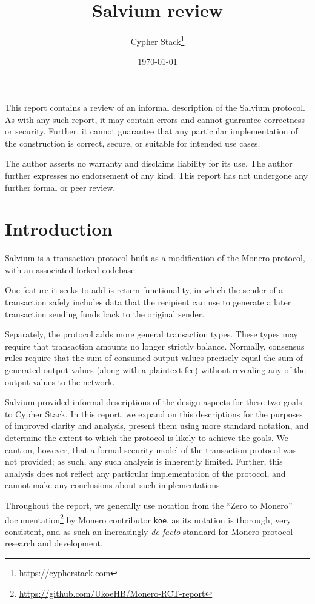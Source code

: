 \documentclass{article}
\title{Salvium review}
\author{Cypher Stack\thanks{\url{https://cypherstack.com}}}
\date{\today}
\begin{document}
\maketitle

This report contains a review of an informal description of the Salvium protocol.
As with any such report, it may contain errors and cannot guarantee correctness or security.
Further, it cannot guarantee that any particular implementation of the construction is correct, secure, or suitable for intended use cases.

The author asserts no warranty and disclaims liability for its use.
The author further expresses no endorsement of any kind.
This report has not undergone any further formal or peer review.

\tableofcontents


\section{Introduction}

Salvium is a transaction protocol built as a modification of the Monero protocol, with an associated forked codebase.

One feature it seeks to add is return functionality, in which the sender of a transaction safely includes data that the recipient can use to generate a later transaction sending funds back to the original sender.

Separately, the protocol adds more general transaction types.
These types may require that transaction amounts no longer strictly balance.
Normally, consensus rules require that the sum of consumed output values precisely equal the sum of generated output values (along with a plaintext fee) without revealing any of the output values to the network.

Salvium provided informal descriptions of the design aspects for these two goals to Cypher Stack.
In this report, we expand on this descriptions for the purposes of improved clarity and analysis, present them using more standard notation, and determine the extent to which the protocol is likely to achieve the goals.
We caution, however, that a formal security model of the transaction protocol was not provided; as such, any such analysis is inherently limited.
Further, this analysis does not reflect any particular implementation of the protocol, and cannot make any conclusions about such implementations.

Throughout the report, we generally use notation from the ``Zero to Monero'' documentation\footnote{\url{https://github.com/UkoeHB/Monero-RCT-report}} by Monero contributor \texttt{koe}, as its notation is thorough, very consistent, and as such an increasingly \textit{de facto} standard for Monero protocol research and development.
\end{document}
